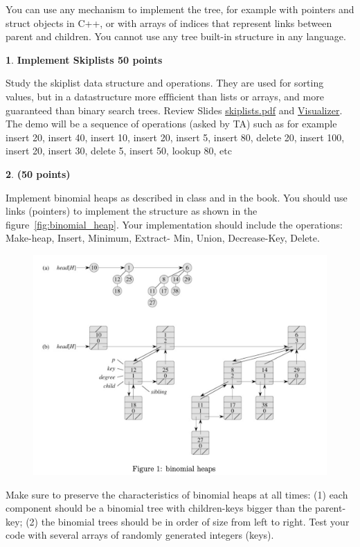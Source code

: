 \documentclass[11pt]{article}
\theoremstyle{definition}
\newtheorem{prob}{}
\newcommand{\solution}{\medskip\noindent{\color{DarkBlue}\textbf{Solution:}}}
\begin{document}
\noindent You  can  use  any  mechanism  to  implement  the  tree,  for  example  with  pointers  and struct objects in C++, or with arrays of indices that represent links between parent and children.  You cannot use any tree built-in structure in any language.


\solution

\begin{prob} \textbf{Implement Skiplists 50 points}
\end{prob}
\noindent Study the skiplist data structure and operations. They are used for sorting values, but in a datastructure more effficient than lists or arrays, and more 
guaranteed than binary search trees.  
Review Slides \href{https://www.ccs.neu.edu/home/vip/teach/Algorithms/7_hash_RBtree_simpleDS/hw_hash_RBtree/skiplists.pdf}{skiplists.pdf}  and \href{https://people.ok.ubc.ca/ylucet/DS/SkipList.html}{Visualizer}.
The demo will be a sequence of operations (asked by TA) such as for example insert 20, insert 40, insert 10, insert 20, insert 5, insert 80, delete 20, insert 100, insert 20, insert 30, delete 5, insert 50, lookup 80, etc

\solution

\begin{prob} \textbf{(50 points)}
\end{prob}
\noindent Implement binomial heaps as described in class and in the book. You
should use links (pointers) to implement the structure as shown in the figure~\ref{fig:binomial_heap}. Your
implementation should include the operations: Make-heap, Insert, Minimum, Extract-
Min, Union, Decrease-Key, Delete.
\begin{figure}[H]
    \centering
    \includegraphics[width=1\linewidth]{image.png}
    
    \label{fig:enter-label}
\end{figure}
Make sure to preserve the characteristics of binomial heaps at all times: (1) each
component should be a binomial tree with children-keys bigger than the parent-key;
(2) the binomial trees should be in order of size from left to right. Test your code
with several arrays of randomly generated integers (keys).
\end{document}
